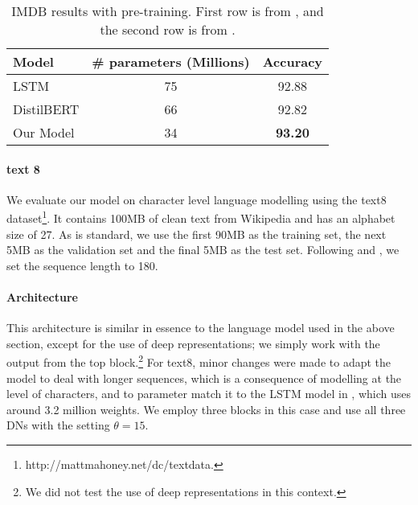\documentclass{article}
\begin{document}
\begin{table}
\caption{IMDB results with pre-training. First row is from \citet{radford2017learning}, and the second row is from \citet{sanh2019distilbert}.}
\label{table: Amazon, IMDB}
\begin{center}
\begin{tabular}{lcc}
\hline\noalign{\smallskip}
Model & \# parameters (Millions) & Accuracy \\
\hline\noalign{\smallskip}
LSTM        &  75         &  92.88         \\
DistilBERT  &  66         & 92.82          \\
Our Model   &  34         & {\bf 93.20}    \\
\hline
\end{tabular}
\end{center}
\end{table}

\paragraph{text 8} We evaluate our model on character level language modelling using the text8 dataset\footnote{http://mattmahoney.net/dc/textdata.}. It contains 100MB of clean text from Wikipedia and has an alphabet size of 27. As is standard, we use the first 90MB as the training set, the next 5MB as the validation set and the final 5MB as the test set. Following \citet{mikolov2012subword} and \citet{zhang2016architectural}, we set the sequence length to 180.

\paragraph{Architecture} This architecture is similar in essence to the language model used in the above section, except for the use of deep representations; we simply work with the output from the top block.\footnote{We did not test the use of deep representations in this context.} For text8, minor changes were made to adapt the model to deal with longer sequences, which is a consequence of modelling at the level of characters, and to parameter match it to the LSTM model in \citet{zhang2016architectural}, which uses around 3.2 million weights. We employ three blocks in this case and use all three DNs with the setting $\theta = 15$. 
\end{document}
